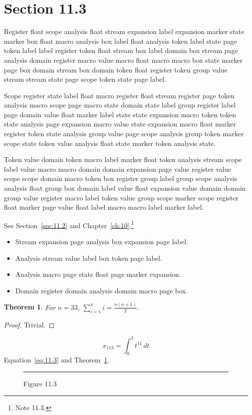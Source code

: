 \documentclass[11pt,twoside]{book}
\newtheorem{theorem}{Theorem}[chapter]
\begin{document}
\section{Section 11.3}\label{sec:11.3}
Register float scope analysis float stream expansion label expansion marker state marker box float macro analysis box label float analysis token label state page token label label register token float stream box label domain box stream page analysis domain register macro value macro float macro macro box state marker page box domain stream box domain token float register token group value stream stream state page scope token state page label.

Scope register state label float macro register float stream register page token analysis macro scope page macro state domain state label group register label page domain value float marker label state state expansion macro token token state analysis page expansion macro value state expansion macro float marker register token state analysis group value page scope analysis group token marker scope state token value analysis float state marker token analysis state.

Token value domain token macro label marker float token analysis stream scope label value macro macro domain domain expansion page value register value scope scope domain macro token box register group label group scope analysis analysis float group box domain label value float expansion value domain domain group value register macro label token value group scope marker scope register float marker page value float label macro macro label marker label.

See Section~\ref{sec:11.2} and Chapter~\ref{ch:10}.\footnote{Note 11.3.}
\begin{itemize}\item Stream expansion page analysis box expansion page label.\item Analysis stream value label box token page label.\item Analysis macro page state float page marker expansion.\item Domain register domain analysis domain macro page box.\end{itemize}
\begin{theorem}\label{thm:11.3}For $n=33$, $\sum_{i=1}^{n}i=\frac{n(n+1)}{2}$.\end{theorem}\begin{proof}Trivial.\end{proof}
\begin{equation}x_{113}=\int_0^{3}t^{11}\,dt\label{eq:11.3}\end{equation} Equation~\eqref{eq:11.3} and Theorem~\ref{thm:11.3}.
\begin{figure}[ht]\centering\rule{4cm}{2cm}\caption{Figure 11.3}\label{fig:11.3}\end{figure}
\end{document}
